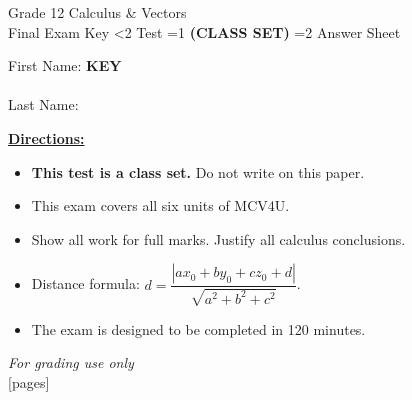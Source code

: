 \documentclass[addpoints]{exam}
\newcommand{\event}{Final Exam}
\newcommand{\tournament}{}
\def\type{0}
\begin{document}
\begin{center}
    {\huge Grade 12 Calculus \& Vectors \\ \event
    \ifprintanswers \space Key
    \else \space \ifnum\type<2 Test \fi \ifnum\type=1 \textbf{(CLASS SET)} \fi
          \ifnum\type=2 Answer Sheet \fi
    \fi \\ \vspace{3mm}\tournament\vspace{1mm}}
\end{center}

\vspace{.25\textheight}

\begin{center}
    First Name: \ifprintanswers
    \underline{\hspace{3.5cm}}\textbf{KEY}\underline{\hspace{5.5cm}}\\\vspace{5mm}
    \else \underline{\hspace{10cm}}\\ \vspace{5mm} \fi
    Last Name: \underline{\hspace{10cm}}\\ \vspace{5mm}
\end{center}

\noindent\textbf{\underline{Directions:}}
\begin{itemize}
    \ifnum\type=1 \item \textbf{This test is a class set.} Do not write on this paper. \fi
    \item This exam covers all six units of MCV4U.
    \item Show all work for full marks. Justify all calculus conclusions.
    \item Distance formula: $d = \dfrac{|ax_0+by_0+cz_0+d|}{\sqrt{a^2+b^2+c^2}}$.
    \item The exam is designed to be completed in 120 minutes.
\end{itemize}
\begin{center}
\textit{For grading use only}\\
[pages]
\end{center}
\end{document}
